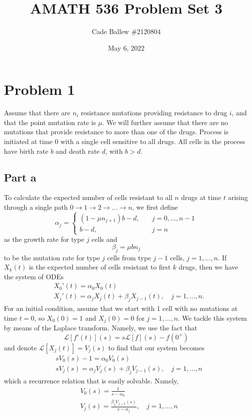 \documentclass{article}
\title{AMATH 536 Problem Set 3}
\author{Cade Ballew \#2120804}
\date{May 6, 2022}
\begin{document}
	
\maketitle
	
\section{Problem 1}
Assume that there are $n_i$ resistance mutations providing resistance to drug $i$, and that the point mutation rate is $\mu$. We will further assume that there are no mutations that provide resistance to more than one of the drugs. Process is initiated at time 0 with a single cell sensitive to all drugs. All cells in the process have birth rate $b$ and death rate $d$, with $b>d$.

\subsection{Part a}
To calculate the expected number of cells resistant to all $n$ drugs at time $t$ arising through a single path $0 \to 1 \to 2 \to...\to n$, we first define 
\[
\alpha_j=\begin{cases}
(1-\mu n_{j+1})b-d, \quad &j=0,\ldots,n-1\\
b-d, \quad &j=n	
\end{cases}
\]
as the growth rate for type $j$ cells and
\[
\beta_j=\mu b n_j
\]
to be the mutation rate for type $j$ cells from type $j-1$ cells, $j=1,\ldots,n$. If $X_k(t)$ is the expected number of cells resistant to first $k$ drugs, then we have the system of ODEs
\begin{align*}
&X_0'(t)=\alpha_0X_0(t)\\
&X_j'(t)=\alpha_jX_j(t)+\beta_{j}X_{j-1}(t), \quad j=1,\ldots,n.
\end{align*}
For an initial condition, assume that we start with 1 cell with no mutations at time $t=0$, so $X_0(0)=1$ and $X_j(0)=0$ for $j=1,\ldots,n$. We tackle this system by means of the Laplace transform. Namely, we use the fact that 
\[
\mathcal{L}[f'(t)](s)=s\mathcal{L}[f](s)-f(0^+)
\]
and denote $\mathcal{L}[X_j(t)]=V_j(s)$ to find that our system becomes
\begin{align*}
	&sV_0(s)-1=\alpha_0V_0(s)\\
	&sV_j(s)=\alpha_jV_j(s)+\beta_{j}V_{j-1}(s), \quad j=1,\ldots,n
\end{align*}
which a recurrence relation that is easily solvable. Namely,
\begin{align*}
	&V_0(s)=\frac{1}{s-\alpha_0}\\
	&V_j(s)=\frac{\beta_{j}V_{j-1}(s)}{s-\alpha_j}, \quad j=1,\ldots,n
\end{align*}
\end{document}
